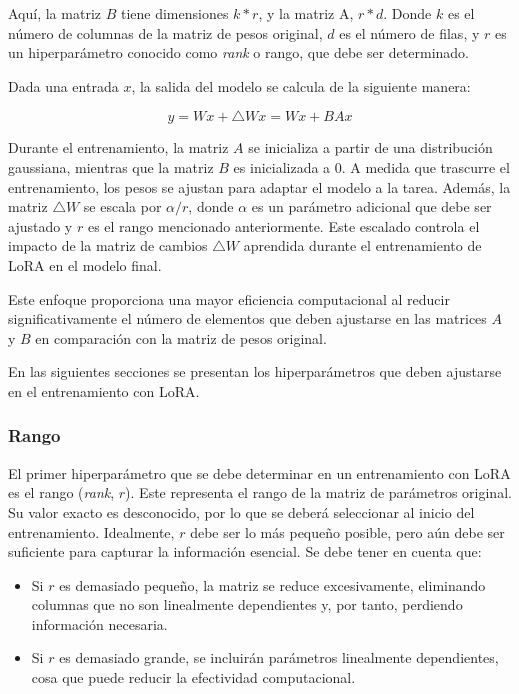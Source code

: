 \documentclass[11pt,spanish,listoffigures,listoftables]{tfgetsinf}
\begin{document}
Aquí, la matriz $B$ tiene dimensiones $k * r$, y la matriz A, $r * d$. Donde $k$ es el número de columnas de la matriz de pesos original, $d$ es el número de filas,  y $r$ es un hiperparámetro conocido como \textit{rank} o rango, que debe ser determinado.

Dada una entrada $x$, la salida del modelo se calcula de la siguiente manera:

\begin{equation}
y = Wx + \bigtriangleup Wx = Wx + BAx
\end{equation}

Durante el entrenamiento, la matriz $A$ se inicializa a partir de una distribución gaussiana, mientras que la matriz $B$ es inicializada a 0. A medida que trascurre el entrenamiento, los pesos se ajustan para adaptar el modelo a la tarea. Además, la matriz $\bigtriangleup W$ se escala por $\alpha / r$, donde $\alpha$ es un parámetro adicional que debe ser ajustado y $r$ es el rango mencionado anteriormente. Este escalado controla el impacto de la matriz de cambios $\bigtriangleup W$ aprendida durante el entrenamiento de LoRA en el modelo final.

Este enfoque proporciona una mayor eficiencia computacional al reducir significativamente el número de elementos que deben ajustarse en las matrices $A$ y $B$ en comparación con la matriz de pesos original. 

En las siguientes secciones se presentan los hiperparámetros que deben ajustarse en el entrenamiento con LoRA.

\subsubsection{Rango}

El primer hiperparámetro que se debe determinar en un entrenamiento con LoRA es el rango (\textit{rank}, $r$). Este representa el rango de la matriz de parámetros original. Su valor exacto es desconocido, por lo que se deberá seleccionar al inicio del entrenamiento. Idealmente, $r$ debe ser lo más pequeño posible, pero aún debe ser suficiente para capturar la información esencial. Se debe tener en cuenta que:

\begin{itemize}
	\item Si $r$ es demasiado pequeño, la matriz se reduce excesivamente, eliminando columnas que no son linealmente dependientes y, por tanto, perdiendo información necesaria.
	\item Si $r$ es demasiado grande, se incluirán parámetros linealmente dependientes, cosa que puede reducir la efectividad computacional.
\end{itemize}
\end{document}

